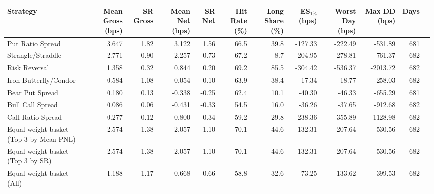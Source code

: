 \begin{tabular}{lrrrrrrrrrrr}
\toprule
Strategy & Mean Gross (bps) & SR Gross & Mean Net (bps) & SR Net & Hit Rate (\%) & Long Share (\%) & ES$_{1\%}$ (bps) & Worst Day (bps) & Max DD (bps) & Days \\
\midrule
Put Ratio Spread & 3.647 & 1.82 & 3.122 & 1.56 & 66.5 & 39.8 & -127.33 & -222.49 & -531.89 & 681 \\
Strangle/Straddle & 2.771 & 0.90 & 2.257 & 0.73 & 67.2 & 8.7 & -204.95 & -278.81 & -761.37 & 682 \\
Risk Reversal & 1.358 & 0.32 & 0.844 & 0.20 & 69.2 & 85.5 & -304.42 & -536.37 & -2013.72 & 682 \\
Iron Butterfly/Condor & 0.584 & 1.08 & 0.054 & 0.10 & 63.9 & 38.4 & -17.34 & -18.77 & -258.03 & 682 \\
Bear Put Spread & 0.180 & 0.13 & -0.338 & -0.25 & 62.4 & 10.1 & -40.30 & -46.33 & -655.29 & 681 \\
Bull Call Spread & 0.086 & 0.06 & -0.431 & -0.33 & 54.5 & 16.0 & -36.26 & -37.65 & -912.68 & 682 \\
Call Ratio Spread & -0.277 & -0.12 & -0.800 & -0.34 & 59.2 & 29.8 & -238.36 & -355.89 & -1128.98 & 682 \\
\midrule
Equal-weight basket (Top 3 by Mean PNL) & 2.574 & 1.38 & 2.057 & 1.10 & 70.1 & 44.6 & -132.31 & -207.64 & -530.56 & 682 \\
Equal-weight basket (Top 3 by SR) & 2.574 & 1.38 & 2.057 & 1.10 & 70.1 & 44.6 & -132.31 & -207.64 & -530.56 & 682 \\
Equal-weight basket (All) & 1.188 & 1.17 & 0.668 & 0.66 & 58.8 & 32.6 & -73.25 & -133.62 & -399.53 & 682 \\
\bottomrule
\end{tabular}
